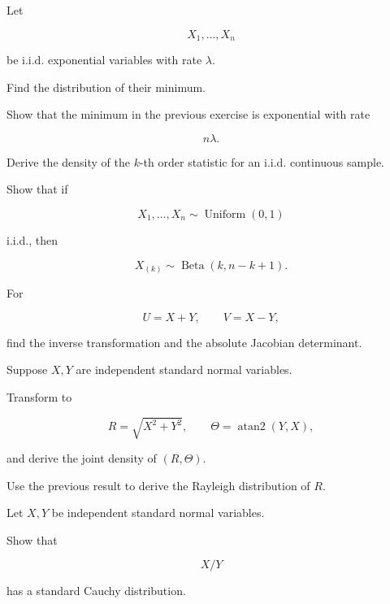 \begin{exercise}[3]
Let

\[
X_1,\ldots,X_n
\]

be i.i.d. exponential variables with rate \(\lambda\).

Find the distribution of their minimum.
\end{exercise}

\begin{exercise}[3]
Show that the minimum in the previous exercise is exponential with rate

\[
n\lambda.
\]
\end{exercise}

\begin{exercise}[3]
Derive the density of the \(k\)-th order statistic for an i.i.d.
continuous sample.
\end{exercise}

\begin{exercise}[3]
Show that if

\[
X_1,\ldots,X_n
\sim
\operatorname{Uniform}(0,1)
\]

i.i.d., then

\[
X_{(k)}
\sim
\operatorname{Beta}(k,n-k+1).
\]
\end{exercise}

\begin{exercise}[3]
For

\[
U=X+Y,
\qquad
V=X-Y,
\]

find the inverse transformation and the absolute Jacobian determinant.
\end{exercise}

\begin{exercise}[3]
Suppose \(X,Y\) are independent standard normal variables.

Transform to

\[
R=\sqrt{X^2+Y^2},
\qquad
\Theta=\operatorname{atan2}(Y,X),
\]

and derive the joint density of \((R,\Theta)\).
\end{exercise}

\begin{exercise}[3]
Use the previous result to derive the Rayleigh distribution of \(R\).
\end{exercise}

\begin{exercise}[3]
Let \(X,Y\) be independent standard normal variables.

Show that

\[
X/Y
\]

has a standard Cauchy distribution.
\end{exercise}

